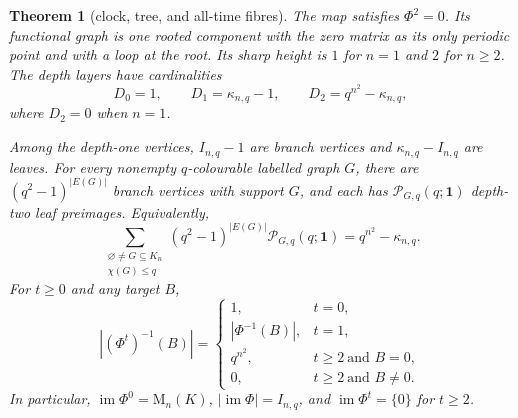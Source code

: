 \documentclass[a4paper,10pt]{amsart}
\newtheorem{theorem}{Theorem}
\theoremstyle{remark}
\newcommand{\Mat}{\mathrm M}
\newcommand{\im}{\operatorname{im}}
\begin{document}
\begin{theorem}[clock, tree, and all-time fibres]\label{thm:graph}
The map satisfies $\Phi^2=0$.  Its functional graph is one rooted component
with the zero matrix as its only periodic point and with a loop at the root.
Its sharp height is $1$ for $n=1$ and $2$ for $n\ge2$.  The depth layers
have cardinalities
\begin{equation}\label{eq:depths}
 D_0=1,\qquad D_1=\kappa_{n,q}-1,\qquad
 D_2=q^{n^2}-\kappa_{n,q},
\end{equation}
where $D_2=0$ when $n=1$.

Among the depth-one vertices, $I_{n,q}-1$ are branch vertices and
$\kappa_{n,q}-I_{n,q}$ are leaves.  For every nonempty $q$-colourable
labelled graph $G$, there are $(q^2-1)^{|E(G)|}$ branch vertices with
support $G$, and each has $\mathcal P_{G,q}(q;\boldsymbol1)$ depth-two leaf
preimages.  Equivalently,
\begin{equation}\label{eq:mass}
 \sum_{\substack{\varnothing\ne G\subseteq K_n\\\chi(G)\le q}}
 (q^2-1)^{|E(G)|}\mathcal P_{G,q}(q;\boldsymbol1)
 =q^{n^2}-\kappa_{n,q}.
\end{equation}
For $t\ge0$ and any target $B$,
\begin{equation}\label{eq:alltime}
 |(\Phi^t)^{-1}(B)|=
 \begin{cases}
 1,&t=0,\\
 |\Phi^{-1}(B)|,&t=1,\\
 q^{n^2},&t\ge2\ \text{and }B=0,\\
 0,&t\ge2\ \text{and }B\ne0.
 \end{cases}
\end{equation}
In particular, $\im\Phi^0=\Mat_n(K)$, $|\im\Phi|=I_{n,q}$, and
$\im\Phi^t=\{0\}$ for $t\ge2$.
\end{theorem}
\end{document}
